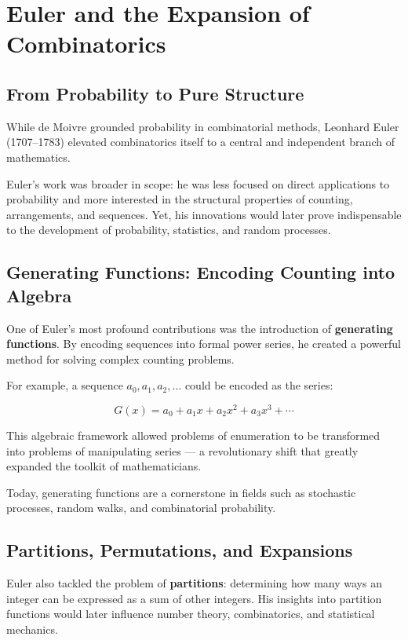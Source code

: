 \section{Euler and the Expansion of Combinatorics}

\subsection{From Probability to Pure Structure}

While de Moivre grounded probability in combinatorial methods, Leonhard Euler (1707--1783) elevated combinatorics itself to a central and independent branch of mathematics.

Euler's work was broader in scope: he was less focused on direct applications to probability and more interested in the structural properties of counting, arrangements, and sequences. Yet, his innovations would later prove indispensable to the development of probability, statistics, and random processes.

\subsection{Generating Functions: Encoding Counting into Algebra}

One of Euler’s most profound contributions was the introduction of \textbf{generating functions}. By encoding sequences into formal power series, he created a powerful method for solving complex counting problems.

For example, a sequence \( a_0, a_1, a_2, \dots \) could be encoded as the series:

\[
G(x) = a_0 + a_1x + a_2x^2 + a_3x^3 + \cdots
\]

This algebraic framework allowed problems of enumeration to be transformed into problems of manipulating series — a revolutionary shift that greatly expanded the toolkit of mathematicians.

Today, generating functions are a cornerstone in fields such as stochastic processes, random walks, and combinatorial probability.

\subsection{Partitions, Permutations, and Expansions}

Euler also tackled the problem of \textbf{partitions}: determining how many ways an integer can be expressed as a sum of other integers. His insights into partition functions would later influence number theory, combinatorics, and statistical mechanics.

